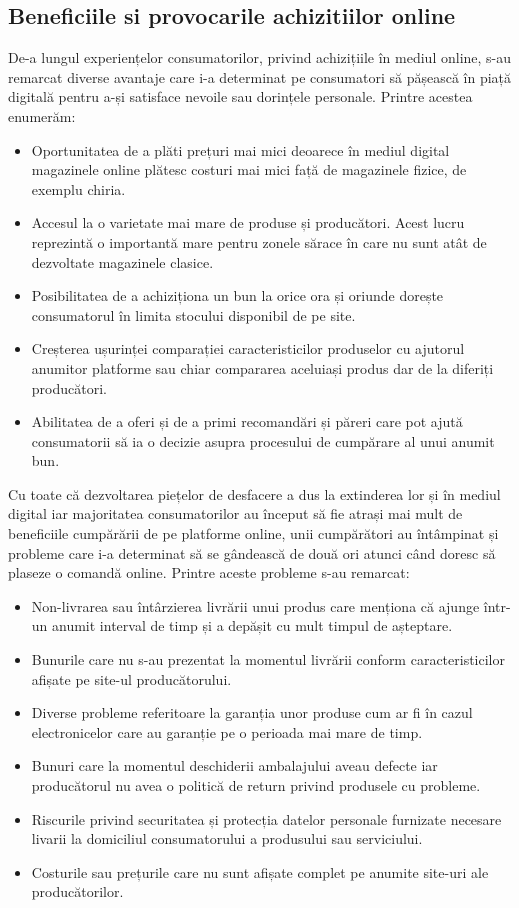 \documentclass[a4paper, 12pt]{article}
\begin{document}
		\subsection{Beneficiile si provocarile achizitiilor online}
		
		\quad De-a lungul experiențelor consumatorilor, privind achizițiile în mediul online, s-au remarcat diverse avantaje care i-a determinat pe consumatori să pășească în piață digitală pentru a-și satisface nevoile sau dorințele personale. Printre acestea enumerăm: 
		\begin{itemize}
			\renewcommand{\labelitemi}{$\Rightarrow$}
			\item Oportunitatea de a plăti prețuri mai mici deoarece în mediul digital magazinele online plătesc costuri mai mici față de magazinele fizice, de exemplu chiria.
			\item  Accesul la o varietate mai mare de produse și producători. Acest lucru reprezintă o importantă mare pentru zonele sărace în care nu sunt atât de dezvoltate magazinele clasice.
			\item Posibilitatea de a achiziționa un bun la orice ora și oriunde dorește consumatorul în limita stocului disponibil de pe site.
			\item Creșterea ușurinței comparației caracteristicilor produselor cu ajutorul anumitor platforme sau chiar compararea aceluiași produs dar de la diferiți producători.
			\item Abilitatea de a  oferi și de a primi recomandări și păreri care pot ajută consumatorii să ia o decizie asupra procesului de cumpărare al unui anumit bun.
		\end{itemize}
		
		\quad Cu toate că dezvoltarea piețelor de desfacere a dus la extinderea lor și în mediul digital iar majoritatea consumatorilor au început să fie atrași mai mult de beneficiile cumpărării de pe platforme online, unii cumpărători au întâmpinat și probleme care i-a determinat să se gândească de două ori atunci când doresc să plaseze o comandă online. Printre aceste probleme s-au remarcat: 
		\begin{itemize}
			\renewcommand{\labelitemi}{$\Rightarrow$}
			\item Non-livrarea sau întârzierea livrării unui produs care menționa că ajunge într-un anumit interval de timp și a depășit cu mult timpul de așteptare. 
			\item Bunurile care nu s-au prezentat la momentul livrării conform caracteristicilor afișate pe site-ul producătorului.
			\item Diverse probleme referitoare la garanția unor produse cum ar fi în cazul electronicelor care au garanție pe o perioada mai mare de timp.
			\item  Bunuri care la momentul deschiderii ambalajului aveau defecte iar producătorul nu avea o politică de return privind produsele cu probleme.
			\item Riscurile privind securitatea și protecția datelor personale furnizate necesare livarii la domiciliul consumatorului a produsului sau serviciului.
			\item Costurile sau prețurile care nu sunt afișate complet pe anumite site-uri ale producătorilor.
		\end{itemize}
\newpage
\end{document}
